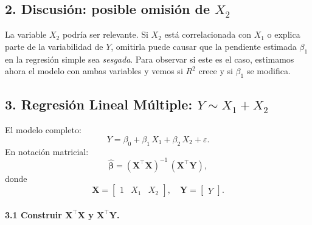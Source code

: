 \documentclass[10pt,a4paper]{article}
\begin{document}
\subsection*{2. Discusi\'on: posible omisi\'on de $X_2$}
La variable $X_2$ podr\'ia ser relevante. Si $X_2$ est\'a correlacionada con $X_1$ o explica parte de la variabilidad de $Y$, omitirla puede causar que la pendiente estimada $\beta_1$ en la regresión simple sea \emph{sesgada}. Para observar si este es el caso, estimamos ahora el modelo con ambas variables y vemos si $R^2$ crece y si $\beta_1$ se modifica.

\subsection*{3. Regresi\'on Lineal M\'ultiple: $Y \sim X_1 + X_2$}

El modelo completo:
\[
Y = \beta_0 + \beta_1\,X_1 + \beta_2\,X_2 + \varepsilon.
\]
En notaci\'on matricial:
\[
\hat{\boldsymbol{\beta}}
= (\mathbf{X}^\top \mathbf{X})^{-1} \, (\mathbf{X}^\top \mathbf{Y}),
\]
donde
\[
\mathbf{X}
=
\begin{bmatrix}
1 & X_1 & X_2
\end{bmatrix},
\quad
\mathbf{Y}
=
\begin{bmatrix}
Y
\end{bmatrix}.
\]

\paragraph{3.1 Construir $\mathbf{X}^\top \mathbf{X}$ y $\mathbf{X}^\top \mathbf{Y}$.}
\end{document}
